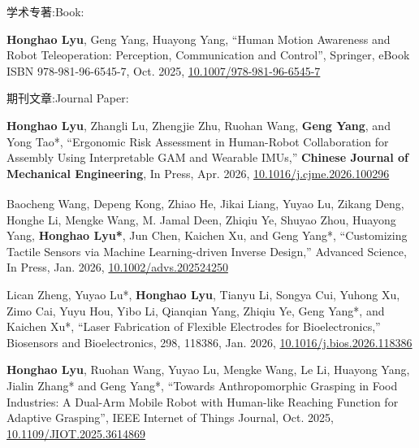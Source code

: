 \resumePOR{}
    {\ifchinese 学术专著:\else Book:\fi}
    {}
\resumeItemListStart
\begin{enumerate}[align=left, widest={[\textbf{S.1}]}, itemindent=0em, label={\textbf{[\arabic*]}]}]
    \item[\textbf{[B.1]}] \textbf{Honghao Lyu}, Geng Yang, Huayong Yang, ``Human Motion Awareness and Robot Teleoperation: Perception, Communication and Control'', Springer, eBook ISBN 978-981-96-6545-7, Oct. 2025, \href{http://doi.org/10.1007/978-981-96-6545-7}{10.1007/978-981-96-6545-7}
\end{enumerate}
\resumeItemListEnd

\resumePOR{}
    {\ifchinese 期刊文章:\else Journal Paper:\fi}
    {}
\resumeItemListStart
\begin{enumerate}[align=left, widest={[\textbf{S.1}]}, itemindent=0em, label={\textbf{[\arabic*]}]}]
    \item[\textbf{[J.33]}] \textbf{Honghao Lyu}, Zhangli Lu, Zhengjie Zhu, Ruohan Wang, \textbf{Geng Yang}, and Yong Tao*, ``Ergonomic Risk Assessment in Human-Robot Collaboration for Assembly Using Interpretable GAM and Wearable IMUs,'' \textbf{Chinese Journal of Mechanical Engineering}, In Press, Apr. 2026, \href{https://doi.org/10.1016/j.cjme.2026.100296}{10.1016/j.cjme.2026.100296}
    \item[\textbf{[J.32]}] Baocheng Wang\textsuperscript{\dag}, Depeng Kong\textsuperscript{\dag}, Zhiao He\textsuperscript{\dag}, Jikai Liang, Yuyao Lu, Zikang Deng, Honghe Li, Mengke Wang, M. Jamal Deen, Zhiqiu Ye, Shuyao Zhou, Huayong Yang, \textbf{Honghao Lyu*}, Jun Chen, Kaichen Xu, and Geng Yang*, ``Customizing Tactile Sensors via Machine Learning-driven Inverse Design,'' Advanced Science, In Press, Jan. 2026, \href{http://doi.org/10.1002/advs.202524250}{10.1002/advs.202524250}
    \item[\textbf{[J.31]}] Lican Zheng, Yuyao Lu*, \textbf{Honghao Lyu}, Tianyu Li, Songya Cui, Yuhong Xu, Zimo Cai, Yuyu Hou, Yibo Li, Qianqian Yang, Zhiqiu Ye, Geng Yang*, and Kaichen Xu*, ``Laser Fabrication of Flexible Electrodes for Bioelectronics,'' Biosensors and Bioelectronics, 298, 118386, Jan. 2026, \href{http://doi.org/10.1016/j.bios.2026.118386}{10.1016/j.bios.2026.118386}
    \item[\textbf{[J.30]}] \textbf{Honghao Lyu}, Ruohan Wang, Yuyao Lu, Mengke Wang, Le Li, Huayong Yang, Jialin Zhang* and Geng Yang*, ``Towards Anthropomorphic Grasping in Food Industries: A Dual-Arm Mobile Robot with Human-like Reaching Function for Adaptive Grasping'', IEEE Internet of Things Journal, Oct. 2025, \href{http://doi.org/10.1109/JIOT.2025.3614869}{10.1109/JIOT.2025.3614869}

\end{enumerate}
